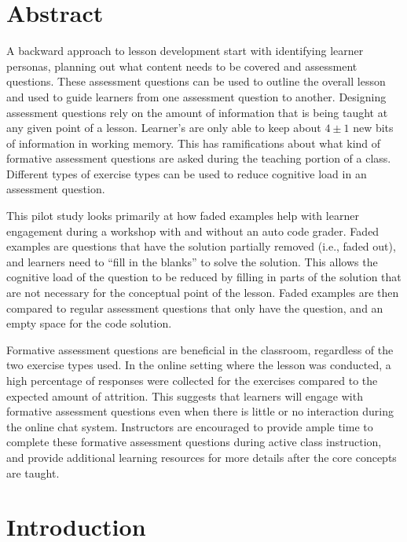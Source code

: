 \documentclass[../main.tex]{subfiles}
\begin{document}
\section*{Abstract}

A backward approach to lesson development start with identifying learner personas,
planning out what content needs to be covered and assessment questions.
These assessment questions can be used to outline the overall lesson
and used to guide learners from one assessment question to another.
Designing assessment questions rely on the amount of information that is being taught
at any given point of a lesson.
Learner's are only able to keep about $4\pm1$ new bits of information in working memory.
This has ramifications about what kind of formative assessment questions
are asked during the teaching portion of a class.
Different types of exercise types can be used
to reduce cognitive load in an assessment question.

This pilot study looks primarily at how faded examples help with learner engagement during a workshop
with and without an auto code grader.
Faded examples are questions that have the solution partially removed (i.e., faded out),
and learners need to ``fill in the blanks'' to solve the solution.
This allows the cognitive load of the question to be reduced by filling in parts of the
solution that are not necessary for the conceptual point of the lesson.
Faded examples are then compared to regular assessment questions that only have the question,
and an empty space for the code solution.

Formative assessment questions are beneficial in the classroom,
regardless of the two exercise types used.
In the online setting where the lesson was conducted,
a high percentage of responses were collected for the exercises compared to the expected amount of attrition.
This suggests that learners will engage with formative assessment questions even when
there is little or no interaction during the online chat system.
Instructors are encouraged to provide ample time to complete these formative assessment questions
during active class instruction,
and provide additional learning resources for more details after the core concepts are taught.

\section{Introduction}

    
\end{document}
